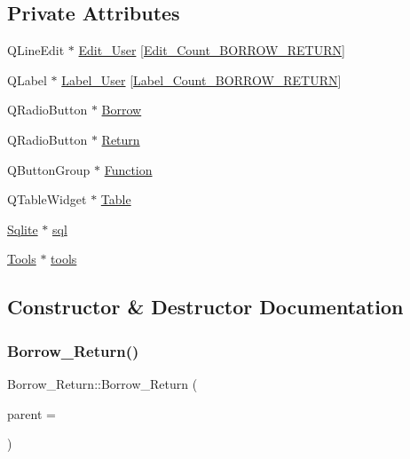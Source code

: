 \subsection*{Private Attributes}
\begin{DoxyCompactItemize}
\item 
Q\+Line\+Edit $\ast$ \mbox{\hyperlink{class_borrow___return_a6ed2efd5439bbcf4661a7c434d21b5ce}{Edit\+\_\+\+User}} \mbox{[}\mbox{\hyperlink{borrow__return_8h_a35b2fb4ddb399d5c884c4199466d78ce}{Edit\+\_\+\+Count\+\_\+\+B\+O\+R\+R\+O\+W\+\_\+\+R\+E\+T\+U\+RN}}\mbox{]}
\item 
Q\+Label $\ast$ \mbox{\hyperlink{class_borrow___return_aa7953f36d477f9beb724ee9201be083f}{Label\+\_\+\+User}} \mbox{[}\mbox{\hyperlink{borrow__return_8h_af38a41a002c7bb91d4bcdd0facb02fbe}{Label\+\_\+\+Count\+\_\+\+B\+O\+R\+R\+O\+W\+\_\+\+R\+E\+T\+U\+RN}}\mbox{]}
\item 
Q\+Radio\+Button $\ast$ \mbox{\hyperlink{class_borrow___return_a0b4d7c64ac6e275c1dce258f58ba82cd}{Borrow}}
\item 
Q\+Radio\+Button $\ast$ \mbox{\hyperlink{class_borrow___return_aca8210d22b3ccbeec32bb9ede58e2a37}{Return}}
\item 
Q\+Button\+Group $\ast$ \mbox{\hyperlink{class_borrow___return_a458f1acacd87199800d7fafa55768b1a}{Function}}
\item 
Q\+Table\+Widget $\ast$ \mbox{\hyperlink{class_borrow___return_a775ac295d8bdf70bac090e3a4aba5745}{Table}}
\item 
\mbox{\hyperlink{class_sqlite}{Sqlite}} $\ast$ \mbox{\hyperlink{class_borrow___return_acdc2c2126c57e62f2efbb7fae20347c4}{sql}}
\item 
\mbox{\hyperlink{class_tools}{Tools}} $\ast$ \mbox{\hyperlink{class_borrow___return_abda1b5957575aacd2a6d705020aa4476}{tools}}
\end{DoxyCompactItemize}


\subsection{Constructor \& Destructor Documentation}
\mbox{\label{class_borrow___return_a60ee7fbb6b774305fbd655bd362572c5}} 
\subsubsection{\texorpdfstring{Borrow\_Return()}{Borrow\_Return()}}
{\footnotesize\ttfamily Borrow\+\_\+\+Return\+::\+Borrow\+\_\+\+Return (\begin{DoxyParamCaption}\item[{Q\+Widget $\ast$}]{parent = {} }\end{DoxyParamCaption})\hspace{0.3cm}{\ttfamily [explicit]}}



